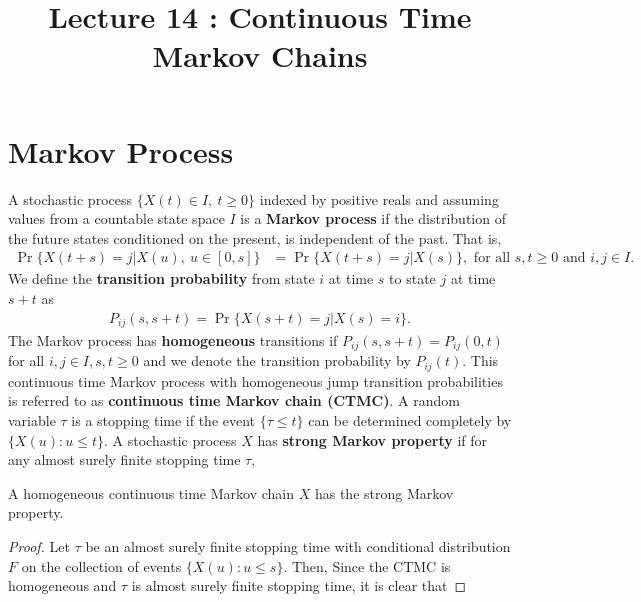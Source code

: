 \documentclass[a4paper,10pt,english]{article}
\title{Lecture 14 : Continuous Time Markov Chains}
\author{}
\begin{document}
\maketitle

\section{Markov Process}
A stochastic process $\{X(t) \in I, ~ t \geqslant 0\}$ indexed by positive reals and assuming values from a countable state space $I$ is a \textbf{Markov process} if 
the distribution of the future states conditioned on the present, is independent of the past. 
That is,
\begin{align*}
\Pr\{X(t+s) = j |X(u),~ u \in [0,s]\} &= \Pr\{X(t+s) = j |X(s)\}, \text{ for all } s, t \geqslant 0 \text{ and } i, j \in I.
\end{align*}
We define the \textbf{transition probability} from state $i$ at time $s$ to state $j$ at time $s+t$ as 
\begin{align*}
P_{ij}(s, s+t) = \Pr\{X(s+t) = j | X(s) = i\}.
\end{align*}
The Markov process has \textbf{homogeneous} transitions if $P_{ij}(s,s+t) = P_{ij}(0,t)$ for all $i,j \in I, s,t \geqslant 0$ and we denote the transition probability by $P_{ij}(t)$. 
This continuous time Markov process with homogeneous jump transition probabilities is referred to as \textbf{continuous time Markov chain (CTMC)}. 
A random variable $\tau$ is a stopping time if the event $\{\tau \leq t\}$ can be determined completely by $\{X(u): u \leqslant t\}$. 
A stochastic process $X$ has \textbf{strong Markov property} if for any almost surely finite stopping time $\tau$, 
\begin{lem}
\label{Lemma:StrongMarkovProperty}
A homogeneous continuous time Markov chain $X$ has the strong Markov property. 
\end{lem}
\begin{proof}
Let $\tau$ be an almost surely finite stopping time with conditional distribution $F$ on the collection of events $\{X(u): u \leq s\}$. 
Then, 
Since the CTMC is homogeneous and $\tau$ is almost surely finite stopping time, it is clear that 
\end{proof}
\end{document}
